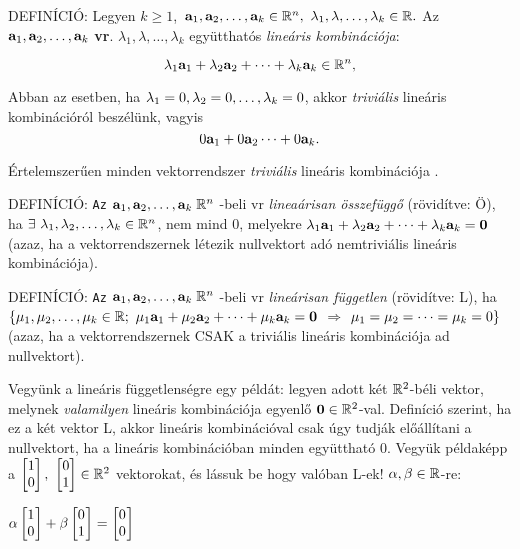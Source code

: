 \documentclass[a4paper,11.5pt]{article}
\begin{document}
	DEFINÍCIÓ: Legyen $k\ge1$,~$\textbf{a}_1, \textbf{a}_2, \ldots , \textbf{a}_k \in \mathbb{R}^{n},~ \lambda_1, \lambda, \ldots , \lambda_k \in \mathbb{R}.$ Az $\textbf{a}_1, \textbf{a}_2, \ldots , \textbf{a}_k$ \textbf{vr}. $\lambda_1, \lambda, \ldots , \lambda_k$ együtthatós \emph{lineáris kombinációja}:
	
	\[\lambda _1\textbf{a}_1+\lambda _2\textbf{a} _2+\dots+\lambda _k \textbf{a}_k \in \mathbb{R}^{n},\]
	
	\noindent Abban az esetben, ha  $\lambda_1=0,  \lambda_2=0, \ldots, \lambda_k=0$, akkor \emph{triviális} lineáris kombinációról beszélünk, vagyis
	\[0\textbf{a} _1+0\textbf{a}_2\dots+0\textbf{a} _k.\]
	
	\noindent Értelemszerűen minden vektorrendszer \emph{triviális} lineáris kombinációja \0.
	
	
	DEFINÍCIÓ: {\tt Az} $\textbf{a} _1, \textbf{a} _2, \dots, \textbf{a} _k \;  \mathbb{R}^{n}${ -beli vr}
	\emph{lineaárisan összefüggő} (rövidítve: Ö), { ha} 
	$\exists~ \lambda _1, \lambda _2, \dots, \lambda _k \in  \mathbb{R}^{n}$, { nem mind} $0$, 
	{ melyekre} $\lambda _1\textbf{a} _1+\lambda _2 \textbf{a} _2+\dots+\lambda _k\textbf{a}_ k = \textbf{0}$ (azaz, ha a
	vektorrendszernek létezik nullvektort adó { nemtriviális} lineáris
	kombinációja). 
		
	DEFINÍCIÓ: {\tt Az} $\textbf{a} _1, \textbf{a} _2, \dots, \textbf{a} _k \;  \mathbb{R}^{n}${ -beli vr}
	\emph{lineárisan független}  (rövidítve: L), { ha} 
	$\{\mu _1, \mu _2, \dots, \mu _k \in  \mathbb{R} ;~ 
	\mu _1\textbf{a} _1+\mu _2 \textbf{a} _2+\dots+\mu_k\textbf{a}_ k = \textbf{0}$ $\Rightarrow $ $\mu _1 =\mu _2 = \dots = \mu _k = 0\}$
	(azaz, ha a vektorrendszernek CSAK { a triviális} lineáris kombinációja ad
	nullvektort). 
	
	\medskip
	Vegyünk a lineáris függetlenségre egy példát: legyen adott két $\mathbb{R}^2$-béli vektor, melynek \emph{valamilyen} lineáris kombinációja egyenlő $\textbf{0} \in \mathbb{R}^2$-val. Definíció szerint, ha ez a két vektor L, akkor lineáris kombinációval csak úgy tudják előállítani a nullvektort, ha a lineáris kombinációban minden együttható 0. Vegyük példaképp a $\begin{bmatrix}
	1\\
	0
	\end{bmatrix},\ 
	\begin{bmatrix}
	0\\
	1
	\end{bmatrix}\in\R^2$ vektorokat, és lássuk be hogy valóban L-ek! $\alpha,\beta\in\mathbb{R}$-re:
	
	\begin{center}
		$\alpha
	\begin{bmatrix}
		1\s\\
		0\s \\
	\end{bmatrix}+
	\beta
	\begin{bmatrix}
	0\s\\
	1\s \\
	\end{bmatrix}=
	\begin{bmatrix}
	0\s\\
	0\s \\
	\end{bmatrix}$
	\end{center}
	
\end{document}
